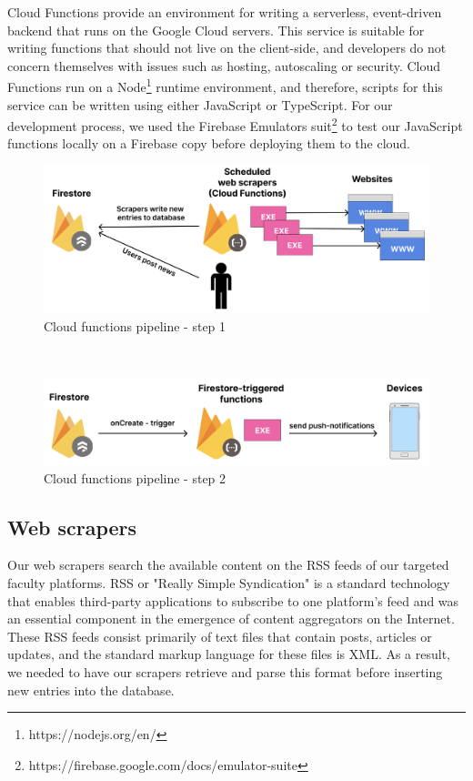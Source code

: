 Cloud Functions provide an environment for writing a serverless, event-driven backend that runs on the Google Cloud servers. This service is suitable for writing functions that should not live on the client-side, and developers do not concern themselves with issues such as hosting, autoscaling or security. Cloud Functions run on a Node\footnote{https://nodejs.org/en/} runtime environment, and therefore, scripts for this service can be written using either JavaScript or TypeScript. For our development process, we used the Firebase Emulators suit\footnote{https://firebase.google.com/docs/emulator-suite} to test our JavaScript functions locally on a Firebase copy before deploying them to the cloud.


\begin{figure}[ht]
    \includegraphics[width=\textwidth]{figures/app/miscellanous/cloud-functions-pipeline-1.png}
    \caption{Cloud functions pipeline - step 1}
    \label{4:fig:cloud_functions_step_1}
\end{figure}

~

\begin{figure}[ht]
    \includegraphics[width=\textwidth]{figures/app/miscellanous/cloud-functions-pipeline-2.png}
    \caption{Cloud functions pipeline - step 2}
    \label{4:fig:cloud_functions_step_2}
\end{figure}

\subsection{Web scrapers} \label{5:web-scrapers}

Our web scrapers search the available content on the RSS feeds of our targeted faculty platforms. RSS or "Really Simple Syndication" is a standard technology that enables third-party applications to subscribe to one platform's feed and was an essential component in the emergence of content aggregators on the Internet. These RSS feeds consist primarily of text files that contain posts, articles or updates, and the standard markup language for these files is XML. As a result, we needed to have our scrapers retrieve and parse this format before inserting new entries into the database.

